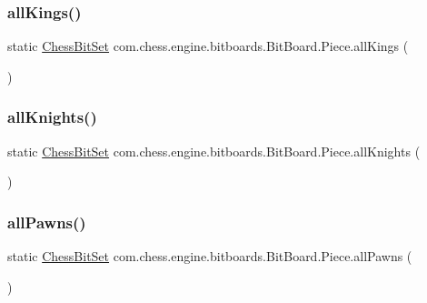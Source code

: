 \subsubsection{\texorpdfstring{allKings()}{allKings()}}
{\footnotesize\ttfamily static \mbox{\hyperlink{classcom_1_1chess_1_1engine_1_1bitboards_1_1_chess_bit_set}{Chess\+Bit\+Set}} com.\+chess.\+engine.\+bitboards.\+Bit\+Board.\+Piece.\+all\+Kings (\begin{DoxyParamCaption}{ }\end{DoxyParamCaption})\hspace{0.3cm}{\ttfamily [static]}}

\mbox{\label{enumcom_1_1chess_1_1engine_1_1bitboards_1_1_bit_board_1_1_piece_a9c493a89df09b3bc5b6008ffc54ba989}} 
\subsubsection{\texorpdfstring{allKnights()}{allKnights()}}
{\footnotesize\ttfamily static \mbox{\hyperlink{classcom_1_1chess_1_1engine_1_1bitboards_1_1_chess_bit_set}{Chess\+Bit\+Set}} com.\+chess.\+engine.\+bitboards.\+Bit\+Board.\+Piece.\+all\+Knights (\begin{DoxyParamCaption}{ }\end{DoxyParamCaption})\hspace{0.3cm}{\ttfamily [static]}}

\mbox{\label{enumcom_1_1chess_1_1engine_1_1bitboards_1_1_bit_board_1_1_piece_aa763af8b0752cd899493161985142191}} 
\subsubsection{\texorpdfstring{allPawns()}{allPawns()}}
{\footnotesize\ttfamily static \mbox{\hyperlink{classcom_1_1chess_1_1engine_1_1bitboards_1_1_chess_bit_set}{Chess\+Bit\+Set}} com.\+chess.\+engine.\+bitboards.\+Bit\+Board.\+Piece.\+all\+Pawns (\begin{DoxyParamCaption}{ }\end{DoxyParamCaption})\hspace{0.3cm}{\ttfamily [static]}}

